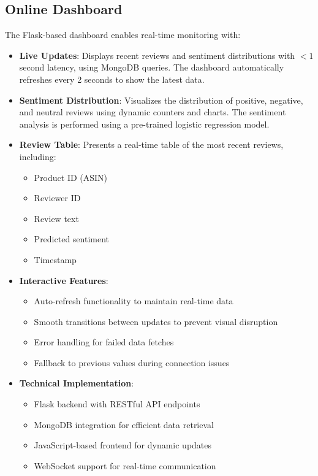 \documentclass[11pt,a4paper,twocolumn]{article}
\begin{document}
\subsection{Online Dashboard}
The Flask-based dashboard enables real-time monitoring with:
\begin{itemize}
    \item \textbf{Live Updates}: Displays recent reviews and sentiment distributions with $<1$ second latency, using MongoDB queries. The dashboard automatically refreshes every 2 seconds to show the latest data.
    \item \textbf{Sentiment Distribution}: Visualizes the distribution of positive, negative, and neutral reviews using dynamic counters and charts. The sentiment analysis is performed using a pre-trained logistic regression model.
    \item \textbf{Review Table}: Presents a real-time table of the most recent reviews, including:
    \begin{itemize}
        \item Product ID (ASIN)
        \item Reviewer ID
        \item Review text
        \item Predicted sentiment
        \item Timestamp
    \end{itemize}
    \item \textbf{Interactive Features}: 
    \begin{itemize}
        \item Auto-refresh functionality to maintain real-time data
        \item Smooth transitions between updates to prevent visual disruption
        \item Error handling for failed data fetches
        \item Fallback to previous values during connection issues
    \end{itemize}
    \item \textbf{Technical Implementation}:
    \begin{itemize}
        \item Flask backend with RESTful API endpoints
        \item MongoDB integration for efficient data retrieval
        \item JavaScript-based frontend for dynamic updates
        \item WebSocket support for real-time communication
    \end{itemize}
\end{itemize}
\end{document}
